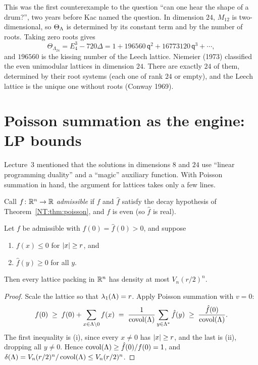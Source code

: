 This was the first counterexample to the question ``can one hear the shape of a drum?'', two years
before Kac named the question. In dimension $24$, $M_{12}$ is two-dimensional, so $\Theta_\Lambda$ is
determined by its constant term and by the number of roots. Taking zero roots gives
\[
  \Theta_{\Lambda_{24}}=E_4^3-720\Delta=1+196560\,\mathsf q^2+16773120\,\mathsf q^3+\cdots,
\]
and $196560$ is the kissing number of the Leech lattice. Niemeier (1973) classified the even unimodular
lattices in dimension $24$. There are exactly $24$ of them, determined by their root systems (each one of
rank $24$ or empty), and the Leech lattice is the unique one without roots (Conway 1969).

\section{Poisson summation as the engine: LP bounds}
\label{NT:sec:LP}

Lecture~3 mentioned that the solutions in dimensions $8$ and $24$ use ``linear programming duality'' and a
``magic'' auxiliary function. With Poisson summation in hand, the argument for lattices takes only a few lines.

\begin{definition}
Call $f\colon\mathbb{R}^n\to\mathbb{R}$ \emph{admissible} if $f$ and $\hat f$ satisfy the decay hypothesis of
Theorem~\ref{NT:thm:poisson}, and $f$ is even (so $\hat f$ is real).
\end{definition}

\begin{theorem}\label{NT:thm:CElattice}
Let $f$ be admissible with $f(0)=\hat f(0)>0$, and suppose
\begin{enumerate}[label=(\roman*),nosep]
\item $f(x)\le0$ for $\left\lvert x \right\rvert\ge r$, and
\item $\hat f(y)\ge0$ for all $y$.
\end{enumerate}
Then every lattice packing in $\mathbb{R}^n$ has density at most $V_n(r/2)^n$.
\end{theorem}

\begin{proof}
Scale the lattice so that $\lambda_1(\Lambda)=r$. Apply Poisson summation with $v=0$:
\[
  f(0)\;\ge\;f(0)+\sum_{x\in\Lambda\setminus0}f(x)\;=\;\frac{1}{\operatorname{covol}(\Lambda)}\sum_{y\in\Lambda^*}\hat f(y)
  \;\ge\;\frac{\hat f(0)}{\operatorname{covol}(\Lambda)}.
\]
The first inequality is (i), since every $x\ne0$ has $\left\lvert x \right\rvert\ge r$, and the last is (ii), dropping
all $y\ne0$. Hence $\operatorname{covol}(\Lambda)\ge\hat f(0)/f(0)=1$, and $\delta(\Lambda)=V_n(r/2)^n/\operatorname{covol}(\Lambda)\le V_n(r/2)^n$.
\end{proof}

